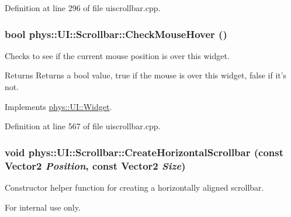 Definition at line 296 of file uiscrollbar.cpp.

\hypertarget{classphys_1_1UI_1_1Scrollbar_a8afdd63e36a7fdc15bd8660d9800f2c5}{
\subsubsection[{CheckMouseHover}]{\setlength{\rightskip}{0pt plus 5cm}bool phys::UI::Scrollbar::CheckMouseHover ()}}
\label{d0/d3e/classphys_1_1UI_1_1Scrollbar_a8afdd63e36a7fdc15bd8660d9800f2c5}


Checks to see if the current mouse position is over this widget. 

\begin{DoxyReturn}{Returns}
Returns a bool value, true if the mouse is over this widget, false if it's not. 
\end{DoxyReturn}


Implements \hyperlink{classphys_1_1UI_1_1Widget_a613df6dbb42efe139d185043a00259dc}{phys::UI::Widget}.



Definition at line 567 of file uiscrollbar.cpp.

\hypertarget{classphys_1_1UI_1_1Scrollbar_af1d5ab4a11a71a1d0c5e6feb4cc88843}{
\subsubsection[{CreateHorizontalScrollbar}]{\setlength{\rightskip}{0pt plus 5cm}void phys::UI::Scrollbar::CreateHorizontalScrollbar (const {\bf Vector2} {\em Position}, \/  const {\bf Vector2} {\em Size})}}
\label{d0/d3e/classphys_1_1UI_1_1Scrollbar_af1d5ab4a11a71a1d0c5e6feb4cc88843}


Constructor helper function for creating a horizontally aligned scrollbar. 

\begin{DoxyInternal}{For internal use only.}
\end{DoxyInternal}



